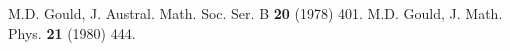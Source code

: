\documentclass[12pt]{article}
\begin{document}
\begin{thebibliography}{10}
% 
% 
% 
% 
% 
% 
% 
 M.D. Gould, J. Austral. Math. Soc. Ser. B {\bf 20}  (1978) 401.
% 
 M.D. Gould, J. Math. Phys. {\bf 21} (1980) 444.
% 
% 
% 
% 
% 
% 
% 
% 
% 
% 
% 
% 
% 
% 
% 

% 
% 


\end{thebibliography}
\end{document}
